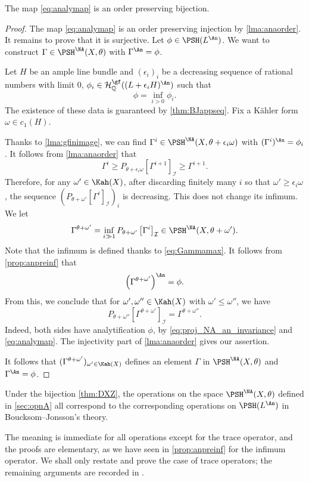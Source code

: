 \begin{theorem}\label{thm:DXZ}
    The map \eqref{eq:analymap} is an order preserving bijection.
\end{theorem}
\begin{proof}
    The map \eqref{eq:analymap} is an order preserving injection by \cref{lma:anaorder}. It remains to prove that it is surjective. Let $\phi\in \PSH(L^{\An})$. We want to construct $\Gamma\in \PSH^{\NA}(X,\theta)$ with $\Gamma^{\An}=\phi$.

    Let $H$ be an ample line bundle and $(\epsilon_i)_i$ be a decreasing sequence of rational numbers with limit $0$, $\phi_i\in \mathcal{H}^{\gf}_{\mathbb{Q}}((L+\epsilon_i H)^{\An})$ such that
    \[
    \phi=\inf_{i>0}\phi_i.
    \]
    The existence of these data is guaranteed by \cref{thm:BJappseq}. Fix a K\"ahler form $\omega\in c_1(H)$.

    Thanks to \cref{lma:gfinimage}, we can find $\Gamma^i\in \PSH^{\NA}(X,\theta+\epsilon_i \omega)$ with $(\Gamma^i)^{\An}=\phi_i$. It follows from \cref{lma:anaorder} that
    \[
    \Gamma^i\geq P_{\theta+\epsilon_i\omega}\left[ \Gamma^{i+1} \right]_{\mathcal{I}} \geq \Gamma^{i+1}.
    \]
    Therefore, for any $\omega'\in \Kah(X)$, after discarding finitely many $i$ so that $\omega'\geq \epsilon_i\omega$, the sequence $(P_{\theta+\omega'}\left[ \Gamma^{i} \right]_{\mathcal{I}})_i$ is decreasing. This does not change its infimum. We let
    \[
    \Gamma^{\theta+\omega'}=\inf_{i\gg 1}P_{\theta+\omega'}\left[ \Gamma^{i} \right]_{\mathcal{I}}\in \PSH^{\NA}(X,\theta+\omega').
    \]
    Note that the infimum is defined thanks to \eqref{eq:Gammamax}. It follows from \cref{prop:anpreinf} that
    \[
    \left(\Gamma^{\theta+\omega'} \right)^{\An}=\phi.
    \]
    From this, we conclude that for $\omega',\omega''\in \Kah(X)$ with $\omega'\leq \omega''$, we have
    \[
    P_{\theta+\omega''}\left[ \Gamma^{\theta+\omega'}\right]_{\mathcal{I}}=\Gamma^{\theta+\omega''}.
    \]
    Indeed, both sides have analytification $\phi$, by \eqref{eq:proj_NA_an_invariance} and \eqref{eq:analymap}. The injectivity part of \cref{lma:anaorder} gives our assertion.

    It follows that $(\Gamma^{\theta+\omega'})_{\omega'\in \Kah(X)}$ defines an element $\Gamma$ in $\PSH^{\NA}(X,\theta)$ and $\Gamma^{\An}=\phi$.
\end{proof}


\begin{theorem}\label{thm:NApotential:L1352}
    Under the bijection \cref{thm:DXZ}, the operations on the space $\PSH^{\NA}(X,\theta)$ defined in \cref{sec:opnA} all correspond to the corresponding operations on $\PSH(L^{\An})$ in Boucksom--Jonsson's theory.
\end{theorem}
The meaning is immediate for all operations except for the trace operator, and the proofs are elementary, as we have seen in \cref{prop:anpreinf} for the infimum operator. We shall only restate and prove the case of trace operators; the remaining arguments are recorded in \cite{Xia23Operations}.

